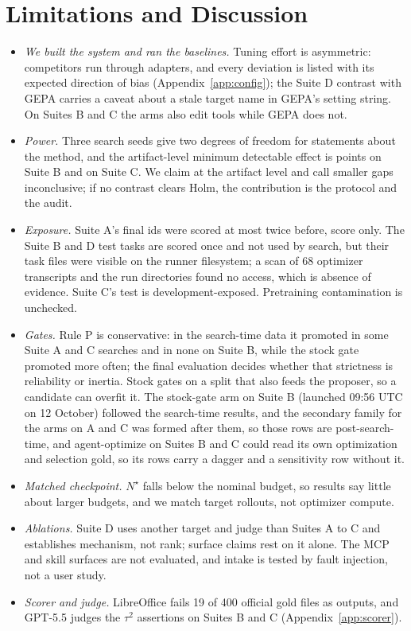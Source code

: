 \section{Limitations and Discussion}
\label{sec:v2:limits}

\begin{itemize}[leftmargin=*,nosep]
\item \emph{We built the system and ran the baselines.} Tuning effort is asymmetric: competitors run through adapters, and every deviation is listed with its expected direction of bias (Appendix~\ref{app:config}); the Suite D contrast with GEPA carries a caveat about a stale target name in GEPA's setting string. On Suites B and C the \capevolve{} arms also edit tools while GEPA does not.
\item \emph{Power.} Three search seeds give two degrees of freedom for statements about the method, and the artifact-level minimum detectable effect is \mdeBCondThree{} points on Suite B and \mdeCCondThree{} on Suite C. We claim at the artifact level and call smaller gaps inconclusive; if no contrast clears Holm, the contribution is the protocol and the audit.
\item \emph{Exposure.} Suite A's final ids were scored at most twice before, score only. The Suite B and D test tasks are scored once and not used by search, but their task files were visible on the runner filesystem; a scan of 68 optimizer transcripts and the run directories found no access, which is absence of evidence. Suite C's test is development-exposed. Pretraining contamination is unchecked.
\item \emph{Gates.} Rule P is conservative: in the search-time data it promoted in some Suite A and C searches and in none on Suite B, while the stock gate promoted more often; the final evaluation decides whether that strictness is reliability or inertia. Stock \capevolve{} gates on a split that also feeds the proposer, so a candidate can overfit it. The stock-gate arm on Suite B (launched 09:56 UTC on 12 October) followed the search-time results, and the secondary family for the arms on A and C was formed after them, so those rows are post-search-time, and agent-optimize on Suites B and C could read its own optimization and selection gold, so its rows carry a dagger and a sensitivity row without it.
\item \emph{Matched checkpoint.} $N^\star$ falls below the nominal budget, so results say little about larger budgets, and we match target rollouts, not optimizer compute.
\item \emph{Ablations.} Suite D uses another target and judge than Suites A to C and establishes mechanism, not rank; surface claims rest on it alone. The MCP and skill surfaces are not evaluated, and intake is tested by fault injection, not a user study.
\item \emph{Scorer and judge.} LibreOffice fails 19 of 400 official gold files as outputs, and GPT-5.5 judges the $\tau^2$ assertions on Suites B and C (Appendix~\ref{app:scorer}).
\end{itemize}

